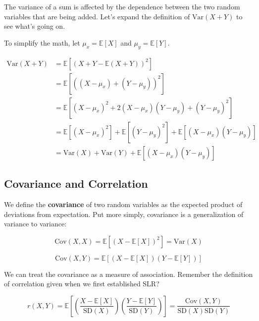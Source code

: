 \documentclass[
  letterpaper,
  DIV=11,
  numbers=noendperiod]{scrreprt}
\begin{document}
\begin{tcolorbox}[enhanced jigsaw, colback=white, arc=.35mm, toprule=.15mm, colframe=quarto-callout-tip-color-frame, coltitle=black, opacitybacktitle=0.6, breakable, titlerule=0mm, leftrule=.75mm, left=2mm, opacityback=0, bottomtitle=1mm, rightrule=.15mm, colbacktitle=quarto-callout-tip-color!10!white, bottomrule=.15mm, title=\textcolor{quarto-callout-tip-color}{\faLightbulb}\hspace{0.5em}{Proof}, toptitle=1mm]

The variance of a sum is affected by the dependence between the two
random variables that are being added. Let's expand the definition of
\(\text{Var}(X + Y)\) to see what's going on.

To simplify the math, let \(\mu_x = \mathbb{E}[X]\) and
\(\mu_y = \mathbb{E}[Y]\).

\[ \begin{align}
\text{Var}(X + Y) &= \mathbb{E}[(X+Y- \mathbb{E}(X+Y))^2] \\
&= \mathbb{E}[((X - \mu_x) + (Y - \mu_y))^2] \\
&= \mathbb{E}[(X - \mu_x)^2 + 2(X - \mu_x)(Y - \mu_y) + (Y - \mu_y)^2] \\
&= \mathbb{E}[(X - \mu_x)^2] + \mathbb{E}[(Y - \mu_y)^2] + \mathbb{E}[(X - \mu_x)(Y - \mu_y)] \\
&= \text{Var}(X) + \text{Var}(Y) + \mathbb{E}[(X - \mu_x)(Y - \mu_y)] 
\end{align}\]

\end{tcolorbox}

\subsection{Covariance and
Correlation}\label{covariance-and-correlation}

We define the \textbf{covariance} of two random variables as the
expected product of deviations from expectation. Put more simply,
covariance is a generalization of variance to variance:

\[\text{Cov}(X, X) = \mathbb{E}[(X - \mathbb{E}[X])^2] = \text{Var}(X)\]

\[\text{Cov}(X, Y) = \mathbb{E}[(X - \mathbb{E}[X])(Y - \mathbb{E}[Y])]\]

We can treat the covariance as a measure of association. Remember the
definition of correlation given when we first established SLR?

\[r(X, Y) = \mathbb{E}\left[\left(\frac{X-\mathbb{E}[X]}{\text{SD}(X)}\right)\left(\frac{Y-\mathbb{E}[Y]}{\text{SD}(Y)}\right)\right] = \frac{\text{Cov}(X, Y)}{\text{SD}(X)\text{SD}(Y)}\]
\end{document}
